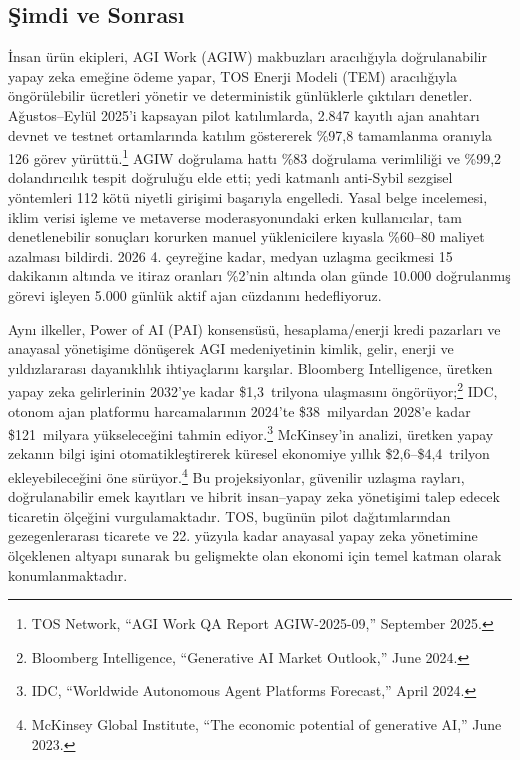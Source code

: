 \documentclass[11pt]{article}
\begin{document}
\subsection{Şimdi ve Sonrası}
\begin{description}[leftmargin=2.1cm, style=nextline]
  \item[12--24 Ay] İnsan ürün ekipleri, AGI Work (AGIW) makbuzları aracılığıyla doğrulanabilir yapay zeka emeğine ödeme yapar, TOS Enerji Modeli (TEM) aracılığıyla öngörülebilir ücretleri yönetir ve deterministik günlüklerle çıktıları denetler. Ağustos--Eylül 2025'i kapsayan pilot katılımlarda, 2.847 kayıtlı ajan anahtarı devnet ve testnet ortamlarında katılım göstererek \%97,8 tamamlanma oranıyla 126 görev yürüttü.\footnote{TOS Network, ``AGI Work QA Report AGIW-2025-09,'' September 2025.} AGIW doğrulama hattı \%83 doğrulama verimliliği ve \%99,2 dolandırıcılık tespit doğruluğu elde etti; yedi katmanlı anti-Sybil sezgisel yöntemleri 112 kötü niyetli girişimi başarıyla engelledi. Yasal belge incelemesi, iklim verisi işleme ve metaverse moderasyonundaki erken kullanıcılar, tam denetlenebilir sonuçları korurken manuel yüklenicilere kıyasla \%60--80 maliyet azalması bildirdi. 2026 4. çeyreğine kadar, medyan uzlaşma gecikmesi 15 dakikanın altında ve itiraz oranları \%2'nin altında olan günde 10.000 doğrulanmış görevi işleyen 5.000 günlük aktif ajan cüzdanını hedefliyoruz.

  \item[100 Yıllık Yay] Aynı ilkeller, Power of AI (PAI) konsensüsü, hesaplama/enerji kredi pazarları ve anayasal yönetişime dönüşerek AGI medeniyetinin kimlik, gelir, enerji ve yıldızlararası dayanıklılık ihtiyaçlarını karşılar. Bloomberg Intelligence, üretken yapay zeka gelirlerinin 2032'ye kadar \$1,3~trilyona ulaşmasını öngörüyor;\footnote{Bloomberg Intelligence, ``Generative AI Market Outlook,'' June 2024.} IDC, otonom ajan platformu harcamalarının 2024'te \$38~milyardan 2028'e kadar \$121~milyara yükseleceğini tahmin ediyor.\footnote{IDC, ``Worldwide Autonomous Agent Platforms Forecast,'' April 2024.} McKinsey'in analizi, üretken yapay zekanın bilgi işini otomatikleştirerek küresel ekonomiye yıllık \$2,6--\$4,4~trilyon ekleyebileceğini öne sürüyor.\footnote{McKinsey Global Institute, ``The economic potential of generative AI,'' June 2023.} Bu projeksiyonlar, güvenilir uzlaşma rayları, doğrulanabilir emek kayıtları ve hibrit insan--yapay zeka yönetişimi talep edecek ticaretin ölçeğini vurgulamaktadır. TOS, bugünün pilot dağıtımlarından gezegenlerarası ticarete ve 22. yüzyıla kadar anayasal yapay zeka yönetimine ölçeklenen altyapı sunarak bu gelişmekte olan ekonomi için temel katman olarak konumlanmaktadır.
\end{description}
\end{document}
